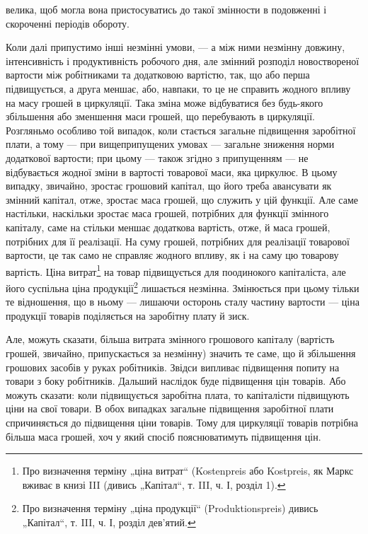 \parcont{}  %
велика, щоб могла вона пристосуватись до такої змінности в подовженні
і скороченні періодів обороту.

Коли далі припустимо інші незмінні умови, — а між ними незмінну
довжину, інтенсивність і продуктивність робочого дня, але змінний
розподіл новоствореної вартости між робітниками та додатковою
вартістю, так, що або перша підвищується, а друга меншає,
або, навпаки, то це не справить жодного впливу на масу грошей в
циркуляції. Така зміна може відбуватися без будь-якого збільшення або
зменшення маси грошей, що перебувають в циркуляції. Розгляньмо особливо
той випадок, коли стається загальне підвищення заробітної плати,
а тому — при вищеприпущених умовах — загальне зниження норми додаткової
вартости; при цьому — також згідно з припущенням — не відбувається
жодної зміни в вартості товарової маси, яка циркулює. В цьому
випадку, звичайно, зростає грошовий капітал, що його треба авансувати
як змінний капітал, отже, зростає маса грошей, що служить у цій
функції. Але саме настільки, наскільки зростає маса грошей, потрібних
для функції змінного капіталу, саме на стільки меншає додаткова вартість,
отже, й маса грошей, потрібних для її реалізації. На суму грошей,
потрібних для реалізації товарової вартости, це так само не справляє
жодного впливу, як і на саму цю товарову вартість. Ціна витрат\footnote*{
Про визначення терміну „ціна витрат“ (Kostenpreis або Kostpreis, як Маркс
вживає в книзі III (дивись „Капітал“, т. III, ч. І, розділ 1). 
} на
товар підвищується для поодинокого капіталіста, але його суспільна ціна
продукції\footnote*{
Про визначення терміну „ціна продукції“ (Produktionspreis) дивись „Капітал“,
т. III, ч. І, розділ дев’ятий. 
} лишається незмінна. Змінюється при цьому тільки те відношення,
що в ньому — лишаючи осторонь сталу частину вартости — ціна
продукції товарів поділяється на заробітну плату й зиск.

Але, можуть сказати, більша витрата змінного грошового капіталу
(вартість грошей, звичайно, припускається за незмінну) значить те саме,
що й збільшення грошових засобів у руках робітників. Звідси випливає
підвищення попиту на товари з боку робітників. Дальший наслідок буде
підвищення цін товарів. Або можуть сказати: коли підвищується заробітна
плата, то капіталісти підвищують ціни на свої товари. В обох випадках
загальне підвищення заробітної плати спричиняється до підвищення ціни
товарів. Тому для циркуляції товарів потрібна більша маса грошей, хоч
у який спосіб пояснюватимуть підвищення цін.


